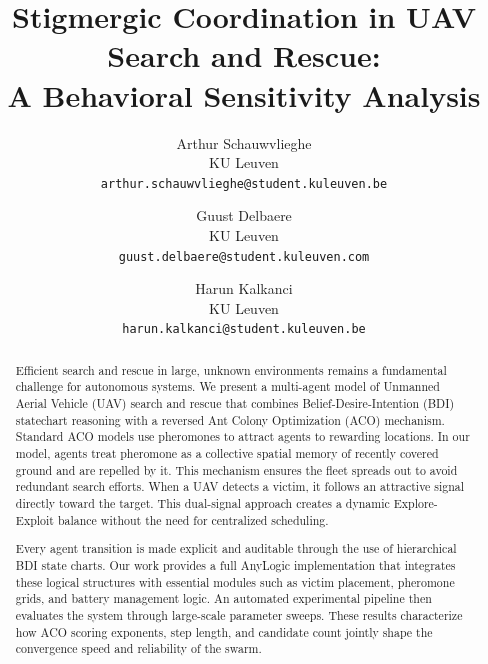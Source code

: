 \documentclass[10pt,a4paper,twocolumn]{article}
\title{Stigmergic Coordination in UAV Search and Rescue:\\A Behavioral Sensitivity Analysis}
\author{
  Arthur Schauwvlieghe \\
  {\small KU Leuven} \\
  \texttt{arthur.schauwvlieghe@student.kuleuven.be}
  \and
  Guust Delbaere \\
  {\small KU Leuven} \\
  \texttt{guust.delbaere@student.kuleuven.com}
  \and
  Harun Kalkanci \\
  {\small KU Leuven} \\
  \texttt{harun.kalkanci@student.kuleuven.be}
}
\date{}
\begin{document}
\maketitle

\begin{abstract}
Efficient search and rescue in large, unknown environments remains a fundamental challenge for autonomous systems. We present a multi-agent model of Unmanned Aerial Vehicle (UAV) search and rescue that combines Belief-Desire-Intention (BDI) statechart reasoning with a reversed Ant Colony Optimization (ACO) mechanism. Standard ACO models use pheromones to attract agents to rewarding locations. In our model, agents treat pheromone as a collective spatial memory of recently covered ground and are repelled by it. This mechanism ensures the fleet spreads out to avoid redundant search efforts. When a UAV detects a victim, it follows an attractive signal directly toward the target. This dual-signal approach creates a dynamic Explore-Exploit balance without the need for centralized scheduling. 

Every agent transition is made explicit and auditable through the use of hierarchical BDI state charts. Our work provides a full AnyLogic implementation that integrates these logical structures with essential modules such as victim placement, pheromone grids, and battery management logic. An automated experimental pipeline then evaluates the system through large-scale parameter sweeps. These results characterize how ACO scoring exponents, step length, and candidate count jointly shape the convergence speed and reliability of the swarm.
\end{abstract}









\balance


% 
\end{document}
